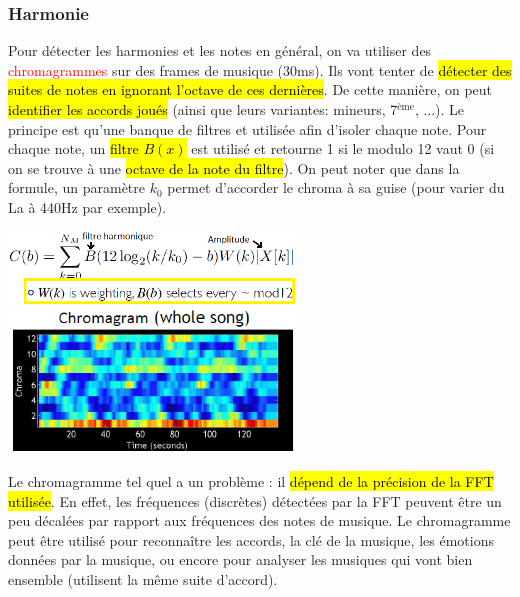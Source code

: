 \documentclass[letterpaper, 12pt]{article}
\newcommand{\alinea}{
\hspace*{0.5cm}}
\newcommand{\red}[1]{
	\textcolor{red}{#1}}
\begin{document}
			\subsubsection{Harmonie}
				\alinea Pour détecter les harmonies et les notes en général, on va utiliser des \red{chromagrammes} sur des 
					frames de musique (30ms). Ils vont tenter de 
					\hl{détecter des suites de notes en ignorant l'octave de ces dernières}. De cette manière, on peut \hl{identifier les
					accords joués} (ainsi que leurs variantes: mineurs, 7$^{\text{\`eme}}$, ...). Le principe est qu'une banque de filtres
					et utilisée afin d'isoler chaque note. Pour chaque note, un \hl{filtre $B(x)$} est utilisé et retourne 1 si le modulo 12 
					vaut 0 (si on se trouve à une \hl{octave de la note du filtre}). On peut noter que dans la formule, un paramètre $k_0$
					permet d'accorder le chroma à sa guise (pour varier du La à 440Hz par exemple).
				\begin{center}
					\includegraphics[width=3in]{Images/chroma-eq} \hfill \includegraphics[width=3in]{Images/chroma}
				\end{center}
				\alinea Le chromagramme tel quel a un problème : il \hl{dépend de la précision de la FFT utilisée}. En effet, les fréquences
					(discrètes) détectées par la FFT peuvent être un peu décalées par rapport aux fréquences des notes de musique.
					Le chromagramme peut être utilisé pour reconnaître les accords, la clé de la musique, les émotions données par la musique,
					ou encore pour analyser les musiques qui vont bien ensemble (utilisent la même suite d'accord).
\end{document}
